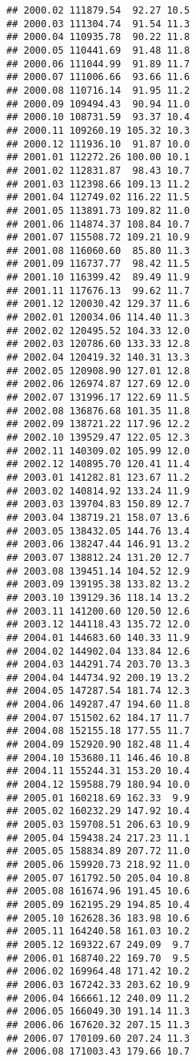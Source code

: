 \documentclass[]{article}
\begin{document}
\begin{verbatim}
## 2000.02 111879.54  92.27 10.5
## 2000.03 111304.74  91.54 11.3
## 2000.04 110935.78  90.22 11.8
## 2000.05 110441.69  91.48 11.8
## 2000.06 111044.99  91.89 11.7
## 2000.07 111006.66  93.66 11.6
## 2000.08 110716.14  91.95 11.2
## 2000.09 109494.43  90.94 11.0
## 2000.10 108731.59  93.37 10.4
## 2000.11 109260.19 105.32 10.3
## 2000.12 111936.10  91.87 10.0
## 2001.01 112272.26 100.00 10.1
## 2001.02 112831.87  98.43 10.7
## 2001.03 112398.66 109.13 11.2
## 2001.04 112749.02 116.22 11.5
## 2001.05 113891.73 109.82 11.0
## 2001.06 114874.37 108.84 10.7
## 2001.07 115508.72 109.21 10.9
## 2001.08 116060.60  85.80 11.3
## 2001.09 116737.77  98.42 11.5
## 2001.10 116399.42  89.49 11.9
## 2001.11 117676.13  99.62 11.7
## 2001.12 120030.42 129.37 11.6
## 2002.01 120034.06 114.40 11.3
## 2002.02 120495.52 104.33 12.0
## 2002.03 120786.60 133.33 12.8
## 2002.04 120419.32 140.31 13.3
## 2002.05 120908.90 127.01 12.8
## 2002.06 126974.87 127.69 12.0
## 2002.07 131996.17 122.69 11.5
## 2002.08 136876.68 101.35 11.8
## 2002.09 138721.22 117.96 12.2
## 2002.10 139529.47 122.05 12.3
## 2002.11 140309.02 105.99 12.0
## 2002.12 140895.70 120.41 11.4
## 2003.01 141282.81 123.67 11.2
## 2003.02 140814.92 133.24 11.9
## 2003.03 139704.83 150.89 12.7
## 2003.04 138719.21 158.07 13.6
## 2003.05 138432.05 144.76 13.4
## 2003.06 138247.44 146.91 13.2
## 2003.07 138812.24 131.20 12.7
## 2003.08 139451.14 104.52 12.9
## 2003.09 139195.38 133.82 13.2
## 2003.10 139129.36 118.14 13.2
## 2003.11 141200.60 120.50 12.6
## 2003.12 144118.43 135.72 12.0
## 2004.01 144683.60 140.33 11.9
## 2004.02 144902.04 133.84 12.6
## 2004.03 144291.74 203.70 13.3
## 2004.04 144734.92 200.19 13.2
## 2004.05 147287.54 181.74 12.3
## 2004.06 149287.47 194.60 11.8
## 2004.07 151502.62 184.17 11.7
## 2004.08 152155.18 177.55 11.7
## 2004.09 152920.90 182.48 11.4
## 2004.10 153680.11 146.46 10.8
## 2004.11 155244.31 153.20 10.4
## 2004.12 159588.79 180.94 10.0
## 2005.01 160218.69 162.33  9.9
## 2005.02 160232.29 147.92 10.4
## 2005.03 159708.51 206.63 10.9
## 2005.04 159438.24 217.23 11.1
## 2005.05 158834.89 207.72 11.0
## 2005.06 159920.73 218.92 11.0
## 2005.07 161792.50 205.04 10.8
## 2005.08 161674.96 191.45 10.6
## 2005.09 162195.29 194.85 10.4
## 2005.10 162628.36 183.98 10.6
## 2005.11 164240.58 161.03 10.2
## 2005.12 169322.67 249.09  9.7
## 2006.01 168740.22 169.70  9.5
## 2006.02 169964.48 171.42 10.2
## 2006.03 167242.33 203.62 10.9
## 2006.04 166661.12 240.09 11.2
## 2006.05 166049.30 191.14 11.3
## 2006.06 167620.32 207.15 11.3
## 2006.07 170109.60 207.24 11.3
## 2006.08 171003.43 179.66 10.7

\end{verbatim}
\end{document}
